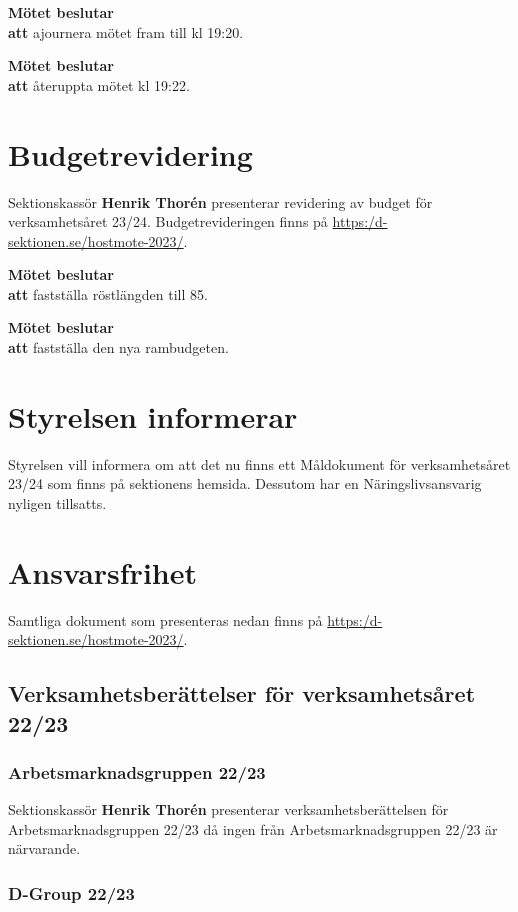 \documentclass{datateknologsektionen-document}
\newcommand{\ind}{\hspace*{2em}}
\newcommand{\motetbeslutar}{\textbf{Mötet beslutar}}
\newcommand{\att}{\\\ind\textbf{att}}
\begin{document}
\motetbeslutar
\att{} ajournera mötet fram till kl 19:20.

\motetbeslutar
\att{} återuppta mötet kl 19:22.

\section{Budgetrevidering}
Sektionskassör \textbf{Henrik Thorén} presenterar revidering av budget för verksamhetsåret 23/24. Budgetrevideringen finns på \url{https:/d-sektionen.se/hostmote-2023/}.

\motetbeslutar
\att{} fastställa röstlängden till 85.

\motetbeslutar
\att{} fastställa den nya rambudgeten.


\section{Styrelsen informerar}
Styrelsen vill informera om att det nu finns ett Måldokument för verksamhetsåret 23/24 som finns på sektionens hemsida. Dessutom har en Näringslivsansvarig nyligen tillsatts.

\newpage

\section{Ansvarsfrihet}

Samtliga dokument som presenteras nedan finns på \url{https:/d-sektionen.se/hostmote-2023/}.

\subsection{Verksamhetsberättelser för verksamhetsåret 22/23}

\subsubsection{Arbetsmarknadsgruppen 22/23}

 Sektionskassör \textbf{Henrik Thorén} presenterar verksamhetsberättelsen för Arbetsmarknadsgruppen 22/23 då ingen från Arbetsmarknadsgruppen 22/23 är närvarande.

\subsubsection{D-Group 22/23}
\end{document}
